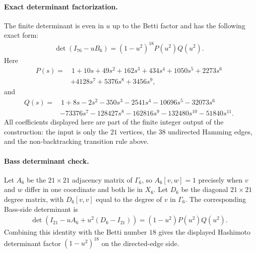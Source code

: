 \paragraph{Exact determinant factorization.}
The finite determinant is even in $u$ up to the Betti factor and has the following exact form:
$$
\begin{aligned}
\det(I_{76}-uB_6)=(1-u^2)^{18}P(u^2)Q(u^2).
\end{aligned}
$$
Here
$$
\begin{aligned}
P(s)=&\,1+10s+49s^2+162s^3+434s^4+1050s^5+2273s^6\\
&+4128s^7+5376s^8+3456s^9,
\end{aligned}
$$
and
$$
\begin{aligned}
Q(s)=&\,1+8s-2s^2-350s^3-2541s^4-10696s^5-32073s^6\\
&-73376s^7-128427s^8-162816s^9-132480s^{10}-51840s^{11}.
\end{aligned}
$$
All coefficients displayed here are part of the finite integer output of the construction: the input is only the $21$ vertices, the $38$ undirected Hamming edges, and the non-backtracking transition rule above.

\paragraph{Bass determinant check.}
Let $A_6$ be the $21\times 21$ adjacency matrix of $\Gamma_6$, so $A_6[v,w]=1$ precisely when $v$ and $w$ differ in one coordinate and both lie in $X_6$. Let $D_6$ be the diagonal $21\times 21$ degree matrix, with $D_6[v,v]$ equal to the degree of $v$ in $\Gamma_6$. The corresponding Bass-side determinant is
$$
\begin{aligned}
\det(I_{21}-uA_6+u^2(D_6-I_{21}))=(1-u^2)P(u^2)Q(u^2).
\end{aligned}
$$
Combining this identity with the Betti number $18$ gives the displayed Hashimoto determinant factor $(1-u^2)^{18}$ on the directed-edge side.

